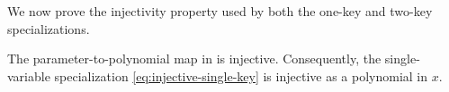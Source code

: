 \vspace{.5em}



We now prove the injectivity property used by both the one-key and two-key
specializations.

\begin{lemma}\label{lem:injective:coeffmap}
The parameter-to-polynomial map in  is
injective.  Consequently, the single-variable specialization
\eqref{eq:injective-single-key} is injective as a polynomial in $x$.
\end{lemma}
